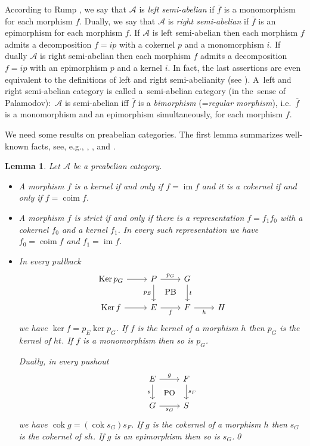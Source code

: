 \documentclass[a4paper,10pt,reqno]{amsart}
\newtheorem{lem}[thm]{Lemma}
\renewcommand{\bar}{\overline}
\newcommand{\Ker}{\operatorname{Ker}\nolimits}
\newcommand{\cok}{\operatorname{cok}\nolimits}
\newcommand{\im}{\operatorname{im}\nolimits}
\newcommand{\coim}{\operatorname{coim}\nolimits}
\begin{document}
	\smallskip
	
	According to Rump \cite[p.~167]{Rump2001}, we say that $\mathcal{A}$ is \textit{left semi-abelian} if $\bar{f}$ is a monomorphism for each morphism $f$. Dually, we say that $\mathcal{A}$ is \textit{right semi-abelian} if $\bar{f}$ is an epimorphism for each morphism $f$. If $\mathcal{A}$ is left semi-abelian then each morphism $f$ admits a decomposition $f=ip$ with a cokernel $p$ and a monomorphism $i$. If dually $\mathcal{A}$ is right semi-abelian then each morphism $f$ admits a decomposition $f=ip$ with an epimorphism $p$ and a kernel $i$. In fact, the last assertions are even equivalent to the definitions of left and right semi-abelianity (see \cite[p.~167]{Rump2001}). A~left and right semi-abelian category
	is called a~semi-abelian category (in the~sense of Palamodov):~$\mathcal{A}$ is semi-abelian iff $\bar{f}$ is a \textit{bimorphism} (=\textit{regular morphism}), i.e.~$\bar{f}$ is a monomorphism and an epimorphism simultaneously, for each morphism $f$. 
	
	We need some results on preabelian categories. The first lemma summarizes well-known facts, see, e.g., \cite[Remark 1.1.2]{Schneiders1999}, \cite[Theorems 1 and 5]{RichmanWalker}, and \cite[Proposition 5.2]{Kelly1969}.
	
	\begin{lem}\label{l1} Let $\mathcal{A}$ be a preabelian category.
		\begin{itemize}
			\item[(i)] A morphism $f$ is a kernel if and only if $f=\im f$ and it is a cokernel if and only if $f=\coim f$.
			\item[(ii)] A morphism $f$ is strict if and only if there is a representation $f=f_1 f_0$ with a cokernel $f_0$ and a kernel $f_1$. In every such representation we have
			$f_0=\coim f$ and $f_1=\im f$.
			\item[(iii)]In every pullback
			$$
			\begin{tikzcd}
				\Ker p_G \arrow[r] & P \arrow[r, "p_G"] \arrow[d, "p_E"'] \arrow[r, "\text{PB}", phantom, bend right=60] & G \arrow[d, "t"]  &   \\
				\Ker f \arrow[r]   & E \arrow[r, "f"']                                                                   & F \arrow[r, "h"'] & H
			\end{tikzcd}
			$$
			we have $\ker f= p_E \ker p_G$. If $f$ is the kernel of a morphism $h$ then $p_G$ is the kernel of $ht$. If $f$ is a monomorphism then so is $p_G$.
			
			\smallskip
			
			Dually, in every pushout
			$$
			\begin{tikzcd}
				& E \arrow[r, "g"] \arrow[d, "s"'] & F \arrow[d, "s_F"] \\
				& G \arrow[r, "s_G"'] & S
				\arrow[from=1-2, to=2-3, phantom, "\text{\small PO}" description]
			\end{tikzcd}
			$$
			we have $\cok g=(\cok s_G) s_F$. If $g$ is the cokernel of a morphism $h$ then $s_G$ is the cokernel of $sh$. If $g$ is an epimorphism then so is $s_G$.\hfill\qed
		\end{itemize}
	\end{lem}
	
\end{document}
